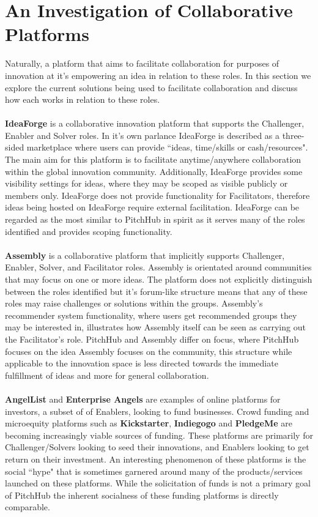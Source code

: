 \section{An Investigation of Collaborative Platforms}
Naturally, a platform that aims to facilitate collaboration for purposes of innovation at it's empowering an idea in relation to these roles. In this section we explore the current solutions being used to facilitate collaboration and discuss how each works in relation to these roles.
\\
\\
\textbf{IdeaForge}\cite{ideaForge:online}
is a collaborative innovation platform that supports the Challenger, Enabler and Solver roles. In it's own parlance IdeaForge is described as a three-sided marketplace where users can provide ``ideas, time/skills or cash/resources". The main aim for this platform is to facilitate anytime/anywhere collaboration within the global innovation community. Additionally, IdeaForge provides some visibility settings for ideas, where they may be scoped as visible publicly or members only. IdeaForge does not provide functionality for Facilitators, therefore ideas being hosted on IdeaForge require external facilitation. IdeaForge can be regarded as the most similar to PitchHub in spirit as it serves many of the roles identified and provides scoping functionality.
\\
\\
\textbf{Assembly}\cite{assembly:online}
is a collaborative platform that implicitly supports Challenger, Enabler, Solver, and Facilitator roles. Assembly is orientated around communities that may focus on one or more ideas. The platform does not explicitly distinguish between the roles identified but it's forum-like structure means that any of these roles may raise challenges or solutions within the groups. Assembly's recommender system functionality, where users get recommended groups they may be interested in, illustrates how Assembly itself can be seen as carrying out the Facilitator's role. PitchHub and Assembly differ on focus, where PitchHub focuses on the idea Assembly focuses on the community, this structure while applicable to the innovation space is less directed towards the immediate fulfillment of ideas and more for general collaboration.
\\
\\
\textbf{AngelList}\cite{Angel:online} and \textbf{Enterprise Angels} are examples of online platforms for investors, a subset of of Enablers, looking to fund businesses. Crowd funding and microequity platforms such as \textbf{Kickstarter}, \textbf{Indiegogo} and \textbf{PledgeMe} are becoming increasingly viable sources of funding. These platforms are primarily for Challenger/Solvers looking to seed their innovations, and Enablers looking to get return on their investment. An interesting phenomenon of these platforms is the social ``hype" that is sometimes garnered around many of the products/services launched on these platforms. While the solicitation of funds is not a primary goal of PitchHub the inherent socialness of these funding platforms is directly comparable.
